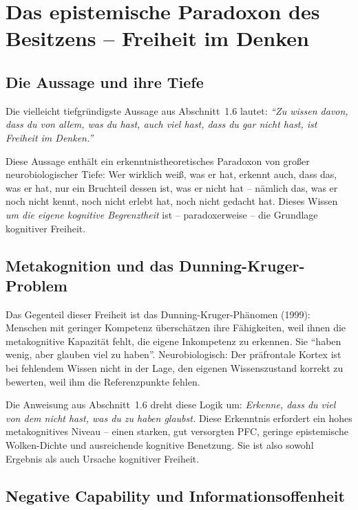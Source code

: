 ﻿\documentclass[12pt,a4paper]{report}
\theoremstyle{plain}
\theoremstyle{definition}
\theoremstyle{remark}
\begin{document}
	\section{Das epistemische Paradoxon des Besitzens -- Freiheit im Denken}

	\subsection{Die Aussage und ihre Tiefe}

	Die vielleicht tiefgründigste Aussage aus Abschnitt~1.6 lautet:
	\emph{``Zu wissen davon, dass du von allem, was du hast, auch viel hast,
	dass du gar nicht hast, ist Freiheit im Denken.''}

	Diese Aussage enthält ein erkenntnistheoretisches Paradoxon
	von großer neurobiologischer Tiefe:
	Wer wirklich weiß, was er hat, erkennt auch,
	dass das, was er hat, nur ein Bruchteil dessen ist,
	was er nicht hat -- nämlich das, was er noch nicht kennt,
	noch nicht erlebt hat, noch nicht gedacht hat.
	Dieses Wissen \emph{um die eigene kognitive Begrenztheit}
	ist -- paradoxerweise -- die Grundlage kognitiver Freiheit.

	\subsection{Metakognition und das Dunning-Kruger-Problem}

	Das Gegenteil dieser Freiheit ist das Dunning-Kruger-Phänomen
	(1999): Menschen mit geringer Kompetenz überschätzen ihre
	Fähigkeiten, weil ihnen die metakognitive Kapazität fehlt,
	die eigene Inkompetenz zu erkennen. Sie ``haben wenig,
	aber glauben viel zu haben''. Neurobiologisch:
	Der präfrontale Kortex ist bei fehlendem Wissen
	nicht in der Lage, den eigenen Wissenszustand korrekt zu bewerten,
	weil ihm die Referenzpunkte fehlen.

	Die Anweisung aus Abschnitt~1.6 dreht diese Logik um:
	\emph{Erkenne, dass du viel von dem nicht hast, was du zu haben glaubst.}
	Diese Erkenntnis erfordert ein hohes metakognitives Niveau --
	einen starken, gut versorgten PFC, geringe epistemische Wolken-Dichte
	und ausreichende kognitive Benetzung.
	Sie ist also sowohl Ergebnis als auch Ursache kognitiver Freiheit.

	\subsection{Negative Capability und Informationsoffenheit}
\end{document}
